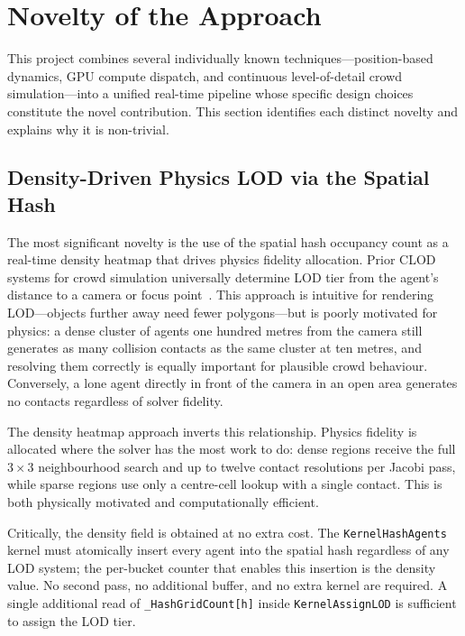 \section{Novelty of the Approach}

This project combines several individually known techniques---position-based
dynamics, GPU compute dispatch, and continuous level-of-detail crowd
simulation---into a unified real-time pipeline whose specific design choices
constitute the novel contribution.  This section identifies each distinct
novelty and explains why it is non-trivial.

\subsection{Density-Driven Physics LOD via the Spatial Hash}

The most significant novelty is the use of the spatial hash occupancy count as
a real-time density heatmap that drives physics fidelity allocation.  Prior
CLOD systems for crowd simulation universally determine LOD tier from the
agent's distance to a camera or focus point~\cite{ulicny2001,helbing1995}.
This approach is intuitive for rendering LOD---objects further away need fewer
polygons---but is poorly motivated for physics: a dense cluster of agents one
hundred metres from the camera still generates as many collision contacts as
the same cluster at ten metres, and resolving them correctly is equally
important for plausible crowd behaviour.  Conversely, a lone agent directly in
front of the camera in an open area generates no contacts regardless of solver
fidelity.

The density heatmap approach inverts this relationship.  Physics fidelity is
allocated where the solver has the most work to do: dense regions receive the
full $3\times 3$ neighbourhood search and up to twelve contact resolutions per
Jacobi pass, while sparse regions use only a centre-cell lookup with a single
contact.  This is both physically motivated and computationally efficient.

Critically, the density field is obtained at no extra cost.  The
\texttt{KernelHashAgents} kernel must atomically insert every agent into the
spatial hash regardless of any LOD system; the per-bucket counter that enables
this insertion is the density value.  No second pass, no additional buffer, and
no extra kernel are required.  A single additional read of
\texttt{\_HashGridCount[h]} inside \texttt{KernelAssignLOD} is sufficient to
assign the LOD tier.

